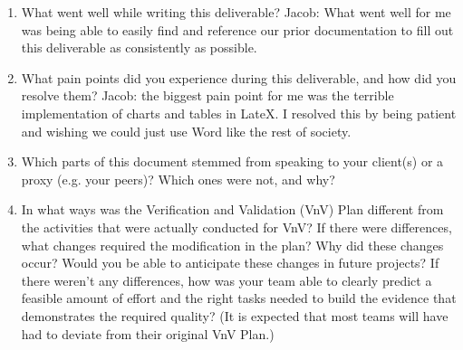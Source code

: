 \documentclass[12pt, titlepage]{article}
\begin{document}
\begin{enumerate}
  \item What went well while writing this deliverable? 
  Jacob: What went well for me was being able to easily find and reference our prior documentation to fill out this deliverable as consistently as possible.
  \item What pain points did you experience during this deliverable, and how
    did you resolve them?
  Jacob: the biggest pain point for me was the terrible implementation of charts and tables in LateX. I resolved this by being patient and wishing we could just use Word like the rest of society.
  \item Which parts of this document stemmed from speaking to your client(s) or
  a proxy (e.g. your peers)? Which ones were not, and why?
  \item In what ways was the Verification and Validation (VnV) Plan different
  from the activities that were actually conducted for VnV?  If there were
  differences, what changes required the modification in the plan?  Why did
  these changes occur?  Would you be able to anticipate these changes in future
  projects?  If there weren't any differences, how was your team able to clearly
  predict a feasible amount of effort and the right tasks needed to build the
  evidence that demonstrates the required quality?  (It is expected that most
  teams will have had to deviate from their original VnV Plan.)
\end{enumerate}
\end{document}
